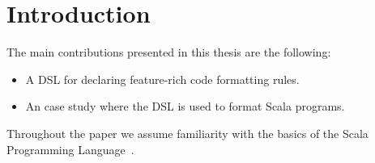 
\section{Introduction} %
\label{sec:Introduction}
The main contributions presented in this thesis are the following:
\begin{itemize}
    \item A DSL for declaring feature-rich code formatting rules.
    \item An case study where the DSL is used to format Scala programs.
\end{itemize}
Throughout the paper we assume familiarity with the basics of the Scala
Programming Language~\autocite{odersky_scala_2004}.
